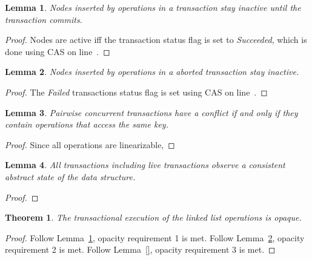 \documentclass[10pt,conference,compsocconf]{IEEEtran}
\newtheorem{theorem}{Theorem}
\newtheorem{lemma}{Lemma}
\begin{document}
\begin{lemma} \label{lmm:inactive}
    Nodes inserted by operations in a transaction stay inactive until the transaction commits.
\end{lemma}
\begin{proof}
    Nodes are active iff the transaction status flag is set to \emph{Succeeded}, which is done using CAS on line~.
\end{proof}

\begin{lemma} \label{lmm:inactive1}
    Nodes inserted by operations in a aborted transaction stay inactive.
\end{lemma}
\begin{proof}
    The \emph{Failed} transactions status flag is set using CAS on line~.
\end{proof}

\begin{lemma}
    Pairwise concurrent transactions have a conflict if and only if they contain operations that access the same key.
\end{lemma}
\begin{proof}
    Since all operations are linearizable, 
\end{proof}

\begin{lemma}
    All transactions including live transactions observe a consistent abstract state of the data structure.
\end{lemma}
\begin{proof}
\end{proof}

\begin{theorem}
    The transactional execution of the linked list operations is opaque.
\end{theorem}
\begin{proof}
Follow Lemma~\ref{lmm:inactive}, opacity requirement 1 is met. 
Follow Lemma~\ref{lmm:inactive1}, opacity requirement 2 is met. 
Follow Lemma~\ref{}, opacity requirement 3 is met. 
\end{proof}
\end{document}
